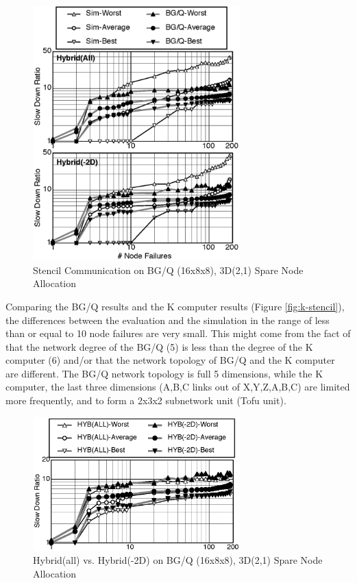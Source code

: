 \documentclass[Afour,times,sagev]{sagej}
\begin{document}
\begin{figure}[ht]
\centering
\includegraphics[width=80mm]{Figs/BGQ-Stencil.eps}
  \caption{Stencil Communication on BG/Q (16x8x8), 3D(2,1) Spare Node
    Allocation}
  \label{fig:bgq-stencil}
\end{figure}

Comparing the BG/Q results and the K computer results (Figure
\ref{fig:k-stencil}), the differences between the evaluation and the
simulation in the range of less than or equal to 10 node failures are
very small. This might come from the fact of that the network degree
of the BG/Q (5) is less than the degree of the K computer (6) and/or
that the network topology of BG/Q and the K computer are different.
The BG/Q network topology is full 5 dimensions, while the K computer,
the last three dimensions (A,B,C links out of X,Y,Z,A,B,C) are limited
more frequently, and to form a 2x3x2 subnetwork unit (Tofu unit).

\begin{figure}[ht]
\centering
\includegraphics[width=80mm]{Figs/BGQ-comparison.eps}
  \caption{Hybrid(all) vs. Hybrid(-2D) on BG/Q (16x8x8), 3D(2,1) Spare
    Node Allocation}
  \label{fig:bgq-comparison}
\end{figure}
\end{document}
